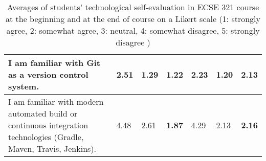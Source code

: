 \begin{table}[htb]
\begin{tabular}{@{}p{8cm}p{1cm}p{1cm}p{1cm}p{1cm}p{1cm}p{1cm}@{}}
I am familiar with Git as a version control system.
& 2.51 & 1.29 & \textbf{1.22} & 2.23 & 1.20 & \textbf{2.13}  \\ \midrule

I am familiar with modern automated build or continuous integration technologies (Gradle, Maven, Travis, Jenkins).
& 4.48 & 2.61 & \textbf{1.87} & 4.29 & 2.13 & \textbf{2.16}  \\ \midrule

\bottomrule
\end{tabular}
\caption{\footnotesize Averages of students' technological self-evaluation in ECSE 321 course at the beginning and at the end of course on a Likert scale (1: strongly agree, 2: somewhat agree, 3: neutral, 4: somewhat disagree, 5: strongly disagree ) }
\label{tab:tech-eval-ecse321}
\end{table}

